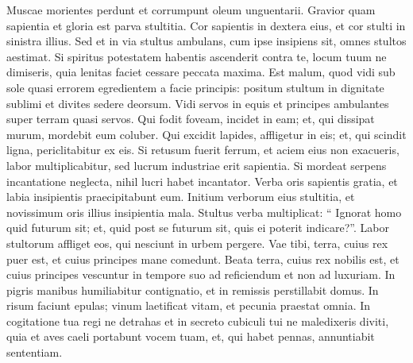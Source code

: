\begin{biblechapter}
\begin{biblechapter}
\begin{biblechapter}
\begin{biblechapter}
\begin{biblechapter}
\begin{biblechapter}
\begin{biblechapter}
\begin{biblechapter}
\begin{biblechapter}
\begin{biblechapter}
\verse Muscae morientes perdunt et corrumpunt oleum unguentarii.
 Gravior quam sapientia et gloria est parva stultitia.
 \verse Cor sapientis in dextera eius,
 et cor stulti in sinistra illius.
 \verse Sed et in via stultus ambulans, cum ipse insipiens sit, omnes stultos aestimat.
 \verse Si spiritus potestatem habentis ascenderit contra te, locum tuum ne dimiseris, quia lenitas faciet cessare peccata maxima.
 \verse Est malum, quod vidi sub sole quasi errorem egredientem a facie principis: 
 \verse positum stultum in dignitate sublimi et divites sedere deorsum. 
\verse Vidi servos in equis et principes ambulantes super terram quasi servos. 
\verse Qui fodit foveam, incidet in eam;
 et, qui dissipat murum, mordebit eum coluber.
 \verse Qui excidit lapides, affligetur in eis;
 et, qui scindit ligna, periclitabitur ex eis.
 \verse Si retusum fuerit ferrum, et aciem eius non exacueris, labor multiplicabitur, sed lucrum industriae erit sapientia.
 \verse Si mordeat serpens incantatione neglecta, nihil lucri habet incantator.
 \verse Verba oris sapientis gratia,
 et labia insipientis praecipitabunt eum.
 \verse Initium verborum eius stultitia,
 et novissimum oris illius insipientia mala.
 \verse Stultus verba multiplicat:
 “ Ignorat homo quid futurum sit;
 et, quid post se futurum sit, quis ei poterit indicare?”.
 \verse Labor stultorum affliget eos,
 qui nesciunt in urbem pergere.
 \verse Vae tibi, terra, cuius rex puer est,
 et cuius principes mane comedunt.
 \verse Beata terra, cuius rex nobilis est,
 et cuius principes vescuntur in tempore suo
 ad reficiendum et non ad luxuriam.
 \verse In pigris manibus humiliabitur contignatio,
 et in remissis perstillabit domus.
 \verse In risum faciunt epulas;
 vinum laetificat vitam,
 et pecunia praestat omnia.
 \verse In cogitatione tua regi ne detrahas
 et in secreto cubiculi tui ne maledixeris diviti,
 quia et aves caeli portabunt vocem tuam,
 et, qui habet pennas, annuntiabit sententiam.
 

\end{biblechapter}
\end{biblechapter}
\end{biblechapter}
\end{biblechapter}
\end{biblechapter}
\end{biblechapter}
\end{biblechapter}
\end{biblechapter}
\end{biblechapter}
\end{biblechapter}
